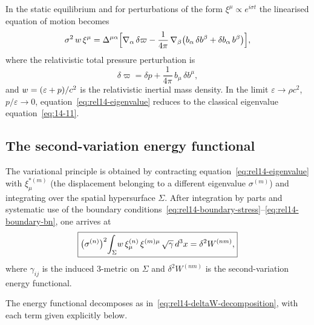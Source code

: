 In the static equilibrium and for perturbations of the form
$\xi^{\mu} \propto e^{i\sigma t}$ the linearised equation of motion
becomes
\begin{equation}
  \sigma^{2}\,w\,\xi^{\mu}
  = \Delta^{\mu\alpha}\Bigl[
      \nabla_{\alpha}\,\delta\varpi
    - \frac{1}{4\pi}\,\nabla_{\beta}
      \bigl(b_{\alpha}\,\delta b^{\beta}
        + \delta b_{\alpha}\,b^{\beta}\bigr)
    \Bigr],
  \label{eq:rel14-eigenvalue}
\end{equation}
where the relativistic total pressure perturbation is
\begin{equation}
  \delta\varpi
  = \delta p + \frac{1}{4\pi}\,b_{\mu}\,\delta b^{\mu},
  \label{eq:rel14-varpi}
\end{equation}
and $w = (\varepsilon+p)/c^{2}$ is the relativistic inertial
mass density.  In the limit $\varepsilon \to \rho c^{2}$, $p/\varepsilon\to0$,
equation~\eqref{eq:rel14-eigenvalue} reduces to the classical
eigenvalue equation~\eqref{eq:14-11}.

\subsection{The second-variation energy
  functional}\label{sec:rel-122-energy}

The variational principle is obtained by contracting
equation~\eqref{eq:rel14-eigenvalue} with $\xi^{*(m)}_{\mu}$ (the
displacement belonging to a different eigenvalue $\sigma^{(m)}$) and
integrating over the spatial hypersurface $\Sigma$.  After integration
by parts and systematic use of the boundary
conditions~\eqref{eq:rel14-boundary-stress}--\eqref{eq:rel14-boundary-bn},
one arrives at
\begin{equation}
  \boxed{
  \bigl(\sigma^{(n)}\bigr)^{2}\!
  \int_{\Sigma}\!w\,
    \xi^{(n)}_{\mu}\,\xi^{(m)\mu}\,
    \sqrt{\gamma}\,d^{3}x
  = \delta^{2}W^{(nm)},}
  \label{eq:rel14-variational}
\end{equation}
where $\gamma_{ij}$ is the induced 3-metric on $\Sigma$ and
$\delta^{2}W^{(nm)}$ is the second-variation energy functional.

The energy functional decomposes as
in~\eqref{eq:rel14-deltaW-decomposition}, with each term given
explicitly below.

